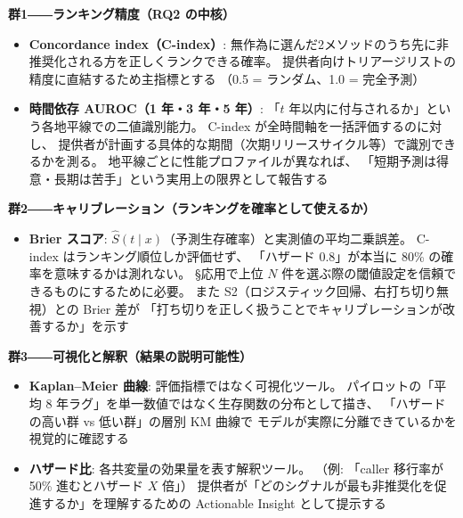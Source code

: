 \documentclass[a4paper,12pt]{article}
\begin{document}
\medskip
\noindent\textbf{群1――ランキング精度（RQ2 の中核）}
\begin{itemize}
  \item \textbf{Concordance index（C-index）}:
        無作為に選んだ2メソッドのうち先に非推奨化される方を正しくランクできる確率。
        提供者向けトリアージリストの精度に直結するため主指標とする
        （0.5 = ランダム、1.0 = 完全予測）
  \item \textbf{時間依存 AUROC（1 年・3 年・5 年）}:
        「$t$ 年以内に付与されるか」という各地平線での二値識別能力。
        C-index が全時間軸を一括評価するのに対し、
        提供者が計画する具体的な期間（次期リリースサイクル等）で識別できるかを測る。
        地平線ごとに性能プロファイルが異なれば、
        「短期予測は得意・長期は苦手」という実用上の限界として報告する
\end{itemize}

\medskip
\noindent\textbf{群2――キャリブレーション（ランキングを確率として使えるか）}
\begin{itemize}
  \item \textbf{Brier スコア}:
        $\hat{S}(t \mid x)$（予測生存確率）と実測値の平均二乗誤差。
        C-index はランキング順位しか評価せず、
        「ハザード 0.8」が本当に 80\% の確率を意味するかは測れない。
        §応用で上位 $N$ 件を選ぶ際の閾値設定を信頼できるものにするために必要。
        また S2（ロジスティック回帰、右打ち切り無視）との Brier 差が
        「打ち切りを正しく扱うことでキャリブレーションが改善するか」を示す
\end{itemize}

\medskip
\noindent\textbf{群3――可視化と解釈（結果の説明可能性）}
\begin{itemize}
  \item \textbf{Kaplan--Meier 曲線}:
        評価指標ではなく可視化ツール。
        パイロットの「平均 8 年ラグ」を単一数値ではなく生存関数の分布として描き、
        「ハザードの高い群 vs 低い群」の層別 KM 曲線で
        モデルが実際に分離できているかを視覚的に確認する
  \item \textbf{ハザード比}:
        各共変量の効果量を表す解釈ツール。
        （例: 「caller 移行率が 50\% 進むとハザード $X$ 倍」）
        提供者が「どのシグナルが最も非推奨化を促進するか」を理解するための
        Actionable Insight として提示する
\end{itemize}
\end{document}
